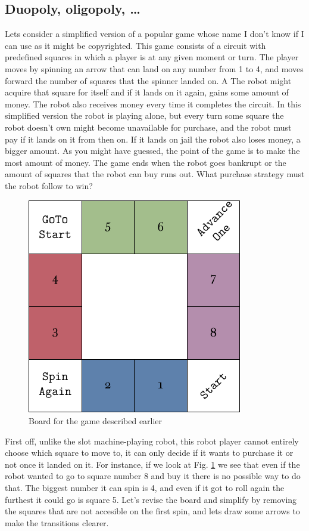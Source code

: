 \subsection{Duopoly, oligopoly, \ldots}
Lets consider a simplified version of a popular game whose name 
I don't know if I can use as it might be copyrighted. This game 
consists of a circuit with predefined squares in which a player is 
at any given moment or turn. The player moves by spinning an 
arrow that can land on any number from 1 to 4, and moves forward 
the number of squares that the spinner landed on. A The robot might 
acquire that square for itself and if it lands on it again, gains 
some amount of money. The robot also receives money every time 
it completes the circuit. In this simplified version the robot 
is playing alone, but every turn some square the robot doesn't own 
might become unavailable for purchase, and the robot must pay if 
it lands on it from then on. If it lands on jail the robot also 
loses money, a bigger amount. As you might have guessed, the 
point of the game is to make the most amount of money. The game 
ends when the robot goes bankrupt or the amount of squares that 
the robot can buy runs out. What purchase strategy must the 
robot follow to win?

\begin{figure}[H]
	\centering
	\includegraphics[width=.75\textwidth]{img/board.pdf}
	\caption{Board for the game described earlier}
	\label{fig:miniopoly-board}
\end{figure}

First off, unlike the slot machine-playing robot, this robot 
player cannot entirely choose which square to move to, it can 
only decide if it wants to purchase it or not once it landed on 
it.  For instance, if we look at Fig. \ref{fig:miniopoly-board} 
we see that even if the robot wanted to go to square number 8 
and buy it there is no possible way to do that. The biggest 
number it can spin is 4, and even if it got to roll again the 
furthest it could go is square 5. Let's revise the board and 
simplify by removing the squares that are not accesible on the 
first spin, and lets draw some arrows to make the transitions 
clearer.

